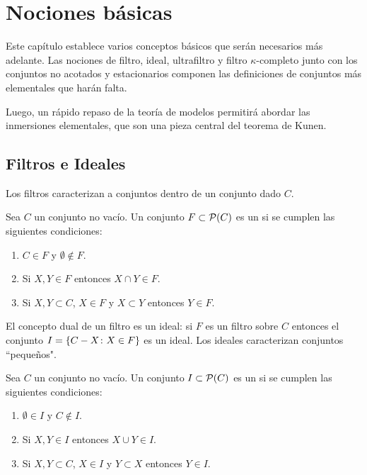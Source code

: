 \chapter{Nociones básicas}

Este capítulo establece varios conceptos básicos que serán necesarios
más adelante. Las nociones de filtro, ideal, ultrafiltro y filtro $\kappa$-completo
junto con los conjuntos no acotados y estacionarios componen las definiciones de
conjuntos más elementales que harán falta.

Luego, un rápido repaso de la teoría de modelos permitirá abordar las inmersiones
elementales, que son una pieza central del teorema de Kunen.

\section{Filtros e Ideales}

Los filtros caracterizan a conjuntos  dentro
de un conjunto dado $C$.
\begin{defi}
    Sea $C$ un conjunto no vacío. Un conjunto $F\subset \mathcal{P}(C)$ es un
     si se cumplen las siguientes condiciones:
    \begin{enumerate}[label=\alph*)]
        \item $C\in F$ y $\emptyset\notin F$.
        \item Si $X,Y\in F$ entonces $X\cap Y\in F$.
        \item Si $X,Y\subset C$, $X\in F$ y $X\subset Y$ entonces $Y\in F$.
    \end{enumerate}
\end{defi}

El concepto dual de un filtro es un ideal:
si $F$ es un filtro sobre $C$ entonces el conjunto 
$I=\left\{  C - X \colon X\in F  \right\}$
es un ideal. Los ideales caracterizan conjuntos ``pequeños".
\begin{defi}
    Sea $C$ un conjunto no vacío. Un conjunto $I\subset \mathcal{P}(C)$ es un
     si se cumplen las siguientes condiciones:
    \begin{enumerate}[label=\alph*)]
        \item $\emptyset\in I$ y $C\notin I$.
        \item Si $X,Y\in I$ entonces $X\cup Y\in I$.
        \item Si $X,Y\subset C$, $X\in I$ y $Y\subset X$ entonces $Y\in I$.
    \end{enumerate}
\end{defi}

